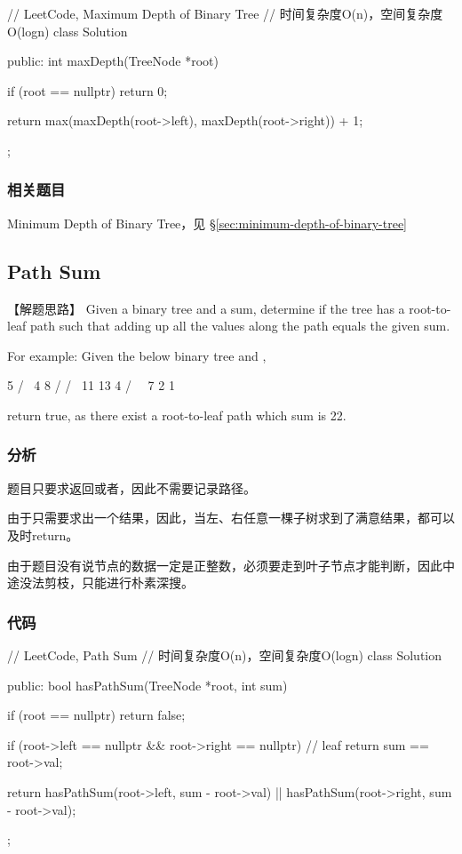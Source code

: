 \begin{Code}
	// LeetCode, Maximum Depth of Binary Tree
	// 时间复杂度O(n)，空间复杂度O(logn)
	class Solution {
		public:
		int maxDepth(TreeNode *root) {
			if (root == nullptr) return 0;
			
			return max(maxDepth(root->left), maxDepth(root->right)) + 1;
		}
	};
\end{Code}


\subsubsection{相关题目}
\begindot
\item Minimum Depth of Binary Tree，见 \S \ref{sec:minimum-depth-of-binary-tree}
\myenddot


\subsection{Path Sum}
\label{sec:path-sum}


【解题思路】
Given a binary tree and a sum, determine if the tree has a root-to-leaf path such that adding up all the values along the path equals the given sum.

For example:
Given the below binary tree and ,
\begin{Code}
	5
	/ \
	4   8
	/   / \
	11  13  4
	/  \      \
	7    2      1
\end{Code}
return true, as there exist a root-to-leaf path  which sum is 22.


\subsubsection{分析}
题目只要求返回或者，因此不需要记录路径。

由于只需要求出一个结果，因此，当左、右任意一棵子树求到了满意结果，都可以及时return。

由于题目没有说节点的数据一定是正整数，必须要走到叶子节点才能判断，因此中途没法剪枝，只能进行朴素深搜。

\subsubsection{代码}

\begin{Code}
	// LeetCode, Path Sum
	// 时间复杂度O(n)，空间复杂度O(logn)
	class Solution {
		public:
		bool hasPathSum(TreeNode *root, int sum) {
			if (root == nullptr) return false;
			
			if (root->left == nullptr && root->right == nullptr) // leaf
			return sum == root->val;
			
			return hasPathSum(root->left, sum - root->val)
			|| hasPathSum(root->right, sum - root->val);
		}
	};
\end{Code}


